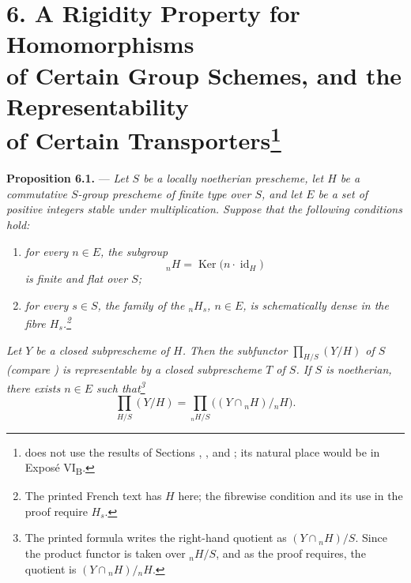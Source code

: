 
\section*{6. A Rigidity Property for Homomorphisms\\
of Certain Group Schemes, and the Representability\\
of Certain Transporters\footnote{ does not use the results of Sections , , and ; its
natural place would be in Exposé VI\textsubscript{B}.}}

\medskip
\noindent{}\textbf{Proposition 6.1.}
---
\textit{Let \(S\) be a locally noetherian prescheme, let \(H\) be a
commutative \(S\)-group prescheme of finite type over \(S\), and let
\(E\) be a set of positive integers stable under multiplication.
Suppose that the following conditions hold:}

\begin{enumerate}
\item[(a)] %
\textit{for every \(n\in E\), the subgroup}
\[
  {}_nH=\operatorname{Ker}\bigl(n\cdot\operatorname{id}_H\bigr)
\]
\textit{is finite and flat over \(S\);}

\item[(b)] %
\textit{for every \(s\in S\), the family of the
\({}_nH_s\), \(n\in E\), is schematically dense in the fibre
\(H_s\).\footnote{The printed French text has \(H\) here; the
fibrewise condition and its use in the proof require \(H_s\).}}
\end{enumerate}

\textit{Let \(Y\) be a closed subprescheme of \(H\).  Then the
subfunctor \(\prod_{H/S}(Y/H)\) of \(S\) (compare ) is
representable by a closed subprescheme \(T\) of \(S\).  If \(S\) is
noetherian, there exists \(n\in E\) such that\footnote{The printed
formula writes the right-hand quotient as
\((Y\cap{}_nH)/S\).  Since the product functor is taken over
\({}_nH/S\), and as the proof requires, the quotient is
\((Y\cap{}_nH)/{}_nH\).}}
\[
  \tag{x}
  \prod_{H/S}(Y/H)
  =
  \prod_{{}_nH/S}\bigl((Y\cap{}_nH)/{}_nH\bigr).
\]

